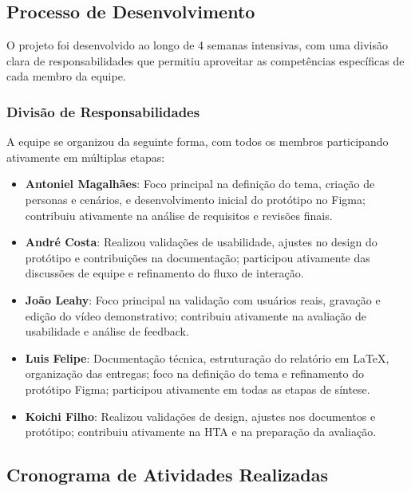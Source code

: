 \documentclass[12pt, a4paper]{report}
\begin{document}
\subsection{Processo de Desenvolvimento}

O projeto foi desenvolvido ao longo de 4 semanas intensivas, com uma divisão clara de responsabilidades que permitiu aproveitar as competências específicas de cada membro da equipe.

\subsubsection{Divisão de Responsabilidades}

A equipe se organizou da seguinte forma, com todos os membros participando ativamente em múltiplas etapas:

\begin{itemize}
    \item \textbf{Antoniel Magalhães}: Foco principal na definição do tema, criação de personas e cenários, e desenvolvimento inicial do protótipo no Figma; contribuiu ativamente na análise de requisitos e revisões finais.
    \item \textbf{André Costa}: Realizou validações de usabilidade, ajustes no design do protótipo e contribuições na documentação; participou ativamente das discussões de equipe e refinamento do fluxo de interação.
    \item \textbf{João Leahy}: Foco principal na validação com usuários reais, gravação e edição do vídeo demonstrativo; contribuiu ativamente na avaliação de usabilidade e análise de feedback.
    \item \textbf{Luis Felipe}: Documentação técnica, estruturação do relatório em LaTeX, organização das entregas; foco na definição do tema e refinamento do protótipo Figma; participou ativamente em todas as etapas de síntese.
    \item \textbf{Koichi Filho}: Realizou validações de design, ajustes nos documentos e protótipo; contribuiu ativamente na HTA e na preparação da avaliação.
\end{itemize}

\subsection{Cronograma de Atividades Realizadas}
\end{document}
